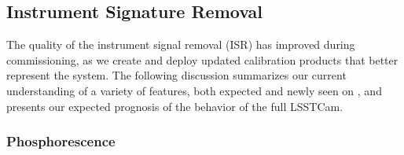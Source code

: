%
%
%
%

\subsection{Instrument Signature Removal}
\label{sec:isr}
\newcommand{\czw}[1]{
  \textbf{CZW: }\textcolor{red}{#1}
}
The quality of the instrument signal removal (ISR) has improved during commissioning, as we create and deploy updated calibration products that better represent the \ComCam system.
The following discussion summarizes our current understanding of a variety of features, both expected and newly seen on \ComCam, and presents our expected prognosis of the behavior of the full LSSTCam.

\subsubsection{Phosphorescence}

